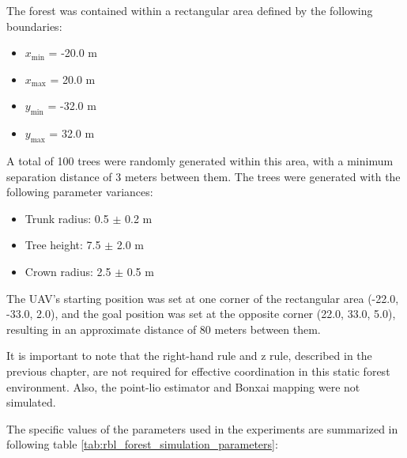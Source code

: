             The forest was contained within a rectangular area defined by the following boundaries:
            \begin{itemize}
                \item $x_{\min}$ = -20.0 m
                \item $x_{\max}$ =  20.0 m
                \item $y_{\min}$ = -32.0 m
                \item $y_{\max}$ =  32.0 m
            \end{itemize}
            A total of 100 trees were randomly generated within this area, with a minimum separation distance of 3 meters between them. 
            The trees were generated with the following parameter variances:
            \begin{itemize}
                \item Trunk radius: 0.5 $\pm$ 0.2 m
                \item Tree height: 7.5 $\pm$ 2.0 m
                \item Crown radius: 2.5 $\pm$ 0.5 m
            \end{itemize}
            The UAV's starting position was set at one corner of the rectangular area (-22.0, -33.0, 2.0), and the goal position was set at the opposite corner (22.0, 33.0, 5.0), resulting in an approximate distance of 80 meters between them.

            It is important to note that the right-hand rule and z rule, described in the previous chapter, are not required for effective coordination in this static forest environment.
            Also, the point-lio estimator and Bonxai mapping were not simulated.

            The specific values of the parameters used in the experiments are summarized in following table \ref{tab:rbl_forest_simulation_parameters}:



